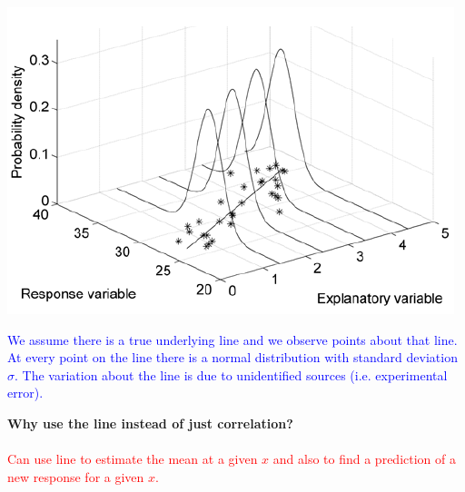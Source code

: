 \begin{center}
\includegraphics[scale=0.7]{regnorm}
\end{center}
\textcolor{blue}{We assume there is a true underlying line and we observe points about that line.  At every point on the line there is a normal distribution with standard deviation $\sigma$.  The variation about the line is due to unidentified sources (i.e. experimental error).}

\newpage

\textbf{Why use the line instead of just correlation?}%
\textcolor{red}{\\~\\Can use line to estimate the mean at a given $x$ and also to find a prediction of a new response for a given $x$.}\\

